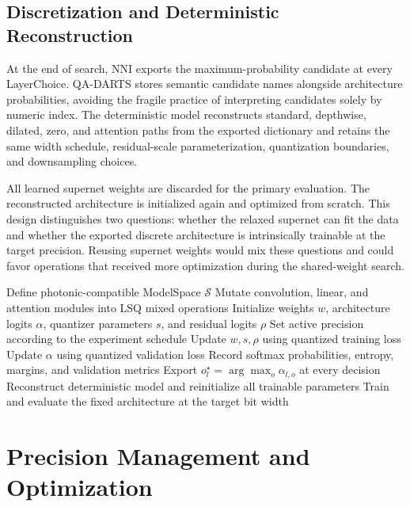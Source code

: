 \documentclass[lettersize,journal]{IEEEtran}
\begin{document}
\subsection{Discretization and Deterministic Reconstruction}
At the end of search, NNI exports the maximum-probability candidate at every LayerChoice. QA-DARTS stores semantic candidate names alongside architecture probabilities, avoiding the fragile practice of interpreting candidates solely by numeric index. The deterministic model reconstructs standard, depthwise, dilated, zero, and attention paths from the exported dictionary and retains the same width schedule, residual-scale parameterization, quantization boundaries, and downsampling choices.

All learned supernet weights are discarded for the primary evaluation. The reconstructed architecture is initialized again and optimized from scratch. This design distinguishes two questions: whether the relaxed supernet can fit the data and whether the exported discrete architecture is intrinsically trainable at the target precision. Reusing supernet weights would mix these questions and could favor operations that received more optimization during the shared-weight search.

\begin{algorithm}[!t]
\caption{QA-DARTS Search and Export}
\label{alg:qadarts}
\begin{algorithmic}[1]
\STATE Define photonic-compatible ModelSpace $\mathcal{S}$
\STATE Mutate convolution, linear, and attention modules into LSQ mixed operations
\STATE Initialize weights $w$, architecture logits $\alpha$, quantizer parameters $s$, and residual logits $\rho$
    \STATE Set active precision according to the experiment schedule
        \STATE Update $w,s,\rho$ using quantized training loss
            \STATE Update $\alpha$ using quantized validation loss
        \ENDIF
    \ENDFOR
    \STATE Record softmax probabilities, entropy, margins, and validation metrics
\ENDFOR
\STATE Export $o_l^{\star}=\arg\max_o\alpha_{l,o}$ at every decision
\STATE Reconstruct deterministic model and reinitialize all trainable parameters
\STATE Train and evaluate the fixed architecture at the target bit width
\end{algorithmic}
\end{algorithm}

\section{Precision Management and Optimization}
\end{document}
